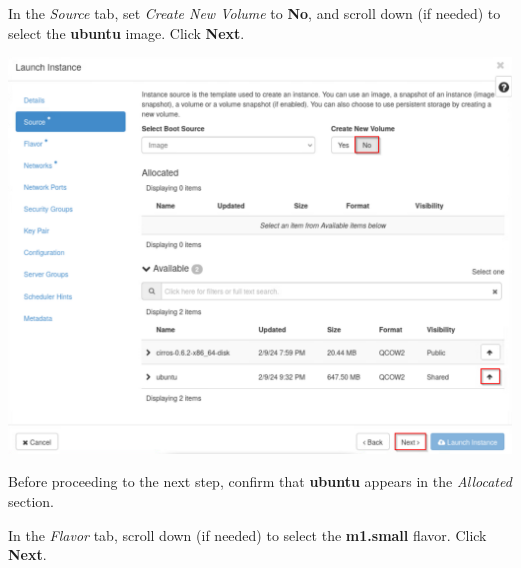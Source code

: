 \documentclass[letterpaper, 12pt]{article}
\begin{document}
\begin{enumerate}
    \begin{labstep}
        In the \textit{Source} tab, set \textit{Create New Volume} to \textbf{No}, and scroll down (if needed) to select the \textbf{ubuntu} image.
        Click \textbf{Next}.

        \begin{center}
            \includegraphics[width=\linewidth]{images/part6/step12.png}
        \end{center}
    \end{labstep}

    \begin{stopbox}
        Before proceeding to the next step, confirm that \textbf{ubuntu} appears in the \textit{Allocated} section.
    \end{stopbox}

    \begin{labstep}
        In the \textit{Flavor} tab, scroll down (if needed) to select the \textbf{m1.small} flavor.
        Click \textbf{Next}.


\end{labstep}
\end{enumerate}
\end{document}
